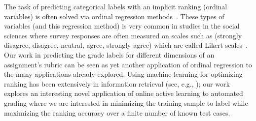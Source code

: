 The task of predicting categorical labels with an implicit ranking (ordinal
variables) is often solved via ordinal regression
methods~\cite{McCullagh:1980}. These types of variables (and this
regression method) is very common in studies in the social sciences where
survey responses are often measured on scales such as (strongly disagree,
disagree, neutral, agree, strongly agree) which are called Likert
scales~\cite{Likert:1932}. Our work in predicting the grade labels for
different dimensions of an assignment's rubric can be seen as yet another
application of ordinal regression to the many applications already
explored. Using machine learning for optimizing ranking has been 
extensively in information retrieval (see, e.g., \cite{Liu:2009}); our work explores 
an interesting novel application of online active learning to automated grading 
where we are interested in minimizing the training sample to label
while maximizing the ranking accuracy over a finite number of known test cases.  





